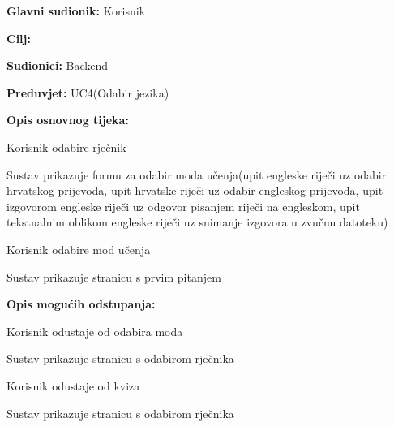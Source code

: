 					\noindent {}
					\begin{packed_item}
						
						\item \textbf{Glavni sudionik: } Korisnik
						\item  \textbf{Cilj:} 
						\item  \textbf{Sudionici:} Backend
						\item  \textbf{Preduvjet:} UC4(Odabir jezika)
						\item  \textbf{Opis osnovnog tijeka:}
						
						\item[] \begin{packed_enum}
							
							\item Korisnik odabire rječnik
							\item Sustav prikazuje formu za odabir moda učenja(upit engleske riječi uz odabir hrvatskog prijevoda, upit hrvatske riječi uz odabir engleskog prijevoda, upit izgovorom engleske riječi uz odgovor pisanjem riječi na engleskom, upit tekstualnim oblikom engleske riječi uz snimanje izgovora u zvučnu datoteku)
							\item Korisnik odabire mod učenja
							\item Sustav prikazuje stranicu s prvim pitanjem
						\end{packed_enum}
						
						\item  \textbf{Opis mogućih odstupanja:}
						
						\item[] \begin{packed_item}
							
							\item[3.a] Korisnik odustaje od odabira moda
							\item[] \begin{packed_enum}
								
								\item Sustav prikazuje stranicu s odabirom rječnika
								
							\end{packed_enum}
							
							\item[4.a] Korisnik odustaje od kviza 
							\item[] \begin{packed_enum}
								
								\item Sustav prikazuje stranicu s odabirom rječnika
								
							\end{packed_enum}
							
						\end{packed_item}
					\end{packed_item}
					
